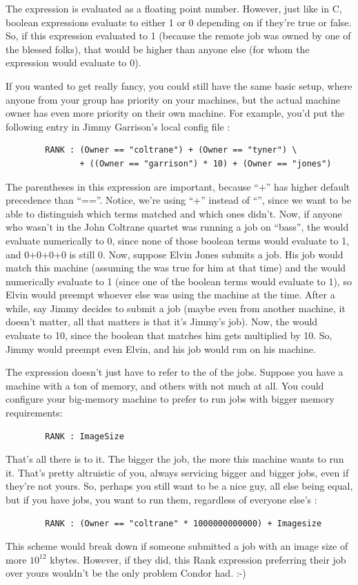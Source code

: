The  expression is evaluated as a floating point number.
However, just like in C, boolean expressions evaluate to either 1 or 0
depending on if they're true or false.  So, if this expression
evaluated to 1 (because the remote job was owned by one of the blessed
folks), that would be higher than anyone else (for whom the expression
would evaluate to 0).

If you wanted to get really fancy, you could still have the same basic
setup, where anyone from your group has priority on your machines, but
the actual machine owner has even more priority on their own machine.
For example, you'd put the following entry in Jimmy Garrison's local
config file :
\begin{verbatim}
        RANK : (Owner == "coltrane") + (Owner == "tyner") \
               + ((Owner == "garrison") * 10) + (Owner == "jones")
\end{verbatim}
\Note The parentheses in this expression are important, because ``+''
               has higher default precedence than ``==''.
Notice, we're using ``+'' instead of ``\Bar\Bar'', since we want to be able
to distinguish which terms matched and which ones didn't.  Now, if
anyone who wasn't in the John Coltrane quartet was running a job on
``bass'', the \Expr{RANK} would evaluate numerically to 0, since none
of those boolean terms would evaluate to 1, and 0+0+0+0 is still 0.
Now, suppose Elvin Jones submits a job.  His job would match this
machine (assuming the \Expr{START} was true for him at that time) and
the \Expr{RANK} would numerically evaluate to 1 (since one of the
boolean terms would evaluate to 1), so Elvin would preempt whoever
else was using the machine at the time.  After a while, say Jimmy
decides to submit a job (maybe even from another machine, it doesn't
matter, all that matters is that it's Jimmy's job).  Now, the
 would evaluate to 10, since the boolean that matches him
gets multiplied by 10.  So, Jimmy would preempt even Elvin, and his
job would run on his machine.

The  expression doesn't just have to refer to the
 of the jobs.  Suppose you have a machine with a ton of
memory, and others with not much at all.  You could configure your
big-memory machine to prefer to run jobs with bigger memory
requirements:
\begin{verbatim}
        RANK : ImageSize
\end{verbatim}

That's all there is to it.  The bigger the job, the more this machine
wants to run it.  That's pretty altruistic of you, always servicing
bigger and bigger jobs, even if they're not yours.  So, perhaps you
still want to be a nice guy, all else being equal, but if you have
jobs, you want to run them, regardless of everyone else's
:
\begin{verbatim}
        RANK : (Owner == "coltrane" * 1000000000000) + Imagesize
\end{verbatim}
This scheme would break down if someone submitted a job with an image
size of more $10^{12}$ kbytes.  However, if they did, this Rank expression
preferring their job over yours wouldn't be the only problem Condor
had. :-)


